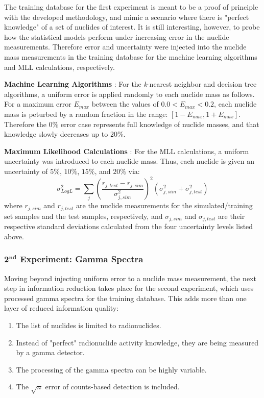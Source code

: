 The training database for the first experiment is meant to be a proof of
principle with the developed methodology, and mimic a scenario where there is
"perfect knowledge" of a set of nuclides of interest. It is still interesting,
however, to probe how the statistical models perform under increasing error in
the nuclide measurements. Therefore error and uncertainty were injected into
the nuclide mass measurements in the training database for the machine learning
algorithms and \gls{MLL} calculations, respectively. 

\noindent \textbf{Machine Learning Algorithms} : For the \textit{k}-nearest
neighbor and decision tree algorithms, a uniform error is applied randomly to
each nuclide mass as follows.  For a maximum error $E_{max}$ between the values
of $0.0 < E_{max} < 0.2$, each nuclide mass is peturbed by a random fraction in
the range: $[1-E_{max},1+E_{max}]$.  Therefore the $0\%$ error case represents
full knowledge of nuclide masses, and that knowledge slowly decreases up to
$20\%$. 

\noindent \textbf{Maximum Likelihood Calculations} : For the \gls{MLL}
calculations, a uniform uncertainty was introduced to each nuclide mass.  Thus,
each nuclide is given an uncertainty of $5\%$, $10\%$, $15\%$, and $20\%$
via:
\begin{equation}
  \label{eq:mllunc}
  \sigma_{Log L}^2 = \sum_j \left( 
                            \frac{r_{j,test} - r_{j,sim}}{\sigma_{j,sim}^2}
                            \right)^2 
                            (\sigma_{j,sim}^2 + \sigma_{j,test}^2)
\end{equation}
where $r_{j,sim}$ and $r_{j,test}$ are the nuclide measurements for the
simulated/training set samples and the test samples, respectively, and
$\sigma_{j,sim}$ and $\sigma_{j,test}$ are their respective standard
deviations calculated from the four uncertainty levels listed above.

\subsubsection{2$^{\mathbf{nd}}$ Experiment: Gamma Spectra}
\label{sec:gamerr}

Moving beyond injecting uniform error to a nuclide mass measurement, the next
step in information reduction takes place for the second experiment, which uses 
processed gamma spectra for the training database. This adds more than one layer of 
reduced information quality:
\begin{enumerate}
  \item \label{itm:1} The list of nuclides is limited to radionuclides.
  \item \label{itm:2} Instead of "perfect" radionuclide activity knowledge, 
        they are being measured by a gamma detector.
  \item \label{itm:3} The processing of the gamma spectra can be highly variable.
  \item \label{itm:4} The $\sqrt{n}$ error of counts-based detection is included. 
\end{enumerate}

